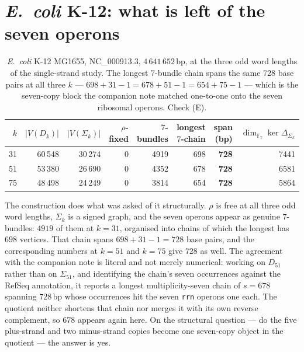 \documentclass[11pt]{article}
\theoremstyle{plain}
\theoremstyle{definition}
\theoremstyle{remark}
\newcommand{\Sig}{\Sigma}
\begin{document}
\section{\emph{E.\ coli} K-12: what is left of the seven operons}

\begin{table}[t]
\centering
\begin{tabular}{rrrrrrrr}
\toprule
$k$ & $|V(D_k)|$ & $|V(\Sig_k)|$ & $\rho$-fixed & $7$-bundles & longest $7$-chain
& span (bp) & $\dim_{\mathbb{F}_7}\ker\Delta_{\Sig_k}$\\
\midrule
31 & 60\,548 & 30\,274 & 0 & 4919 & 698 & \textbf{728} & 7441\\
51 & 53\,380 & 26\,690 & 0 & 4352 & 678 & \textbf{728} & 6581\\
75 & 48\,498 & 24\,249 & 0 & 3814 & 654 & \textbf{728} & 5864\\
\bottomrule
\end{tabular}
\caption{\emph{E.\ coli} K-12 MG1655, NC\_000913.3, $4\,641\,652$\,bp, at the three odd word
lengths of the single-strand study. The longest $7$-bundle chain spans the same $728$
base pairs at all three $k$ --- $698+31-1=678+51-1=654+75-1$ --- which is the seven-copy
block the companion note matched one-to-one onto the seven ribosomal operons. Check (E).}
\label{tab:ecoli}
\end{table}

The construction does what was asked of it structurally. $\rho$ is free at all three odd word
lengths, $\Sig_k$ is a signed graph, and the seven operons appear as genuine $7$-bundles:
$4919$ of them at $k=31$, organised into chains of which the longest has $698$ vertices. That
chain spans $698+31-1=728$ base pairs, and the corresponding numbers at $k=51$ and $k=75$
give $728$ as well. The agreement with the companion note is literal and not merely
numerical: working on $D_{51}$ rather than on $\Sig_{51}$, and identifying the chain's seven
occurrences against the RefSeq annotation, it reports a longest multiplicity-seven chain of
$s=678$ spanning $728$\,bp whose occurrences hit the seven \texttt{rrn} operons one each.
The quotient neither shortens that chain nor merges it with its own reverse complement, so
$678$ appears again here. On the structural question --- do the five plus-strand and two
minus-strand copies become one seven-copy object in the quotient --- the answer is yes.
\end{document}
